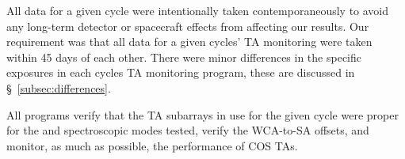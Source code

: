 All data for a given cycle were intentionally taken contemporaneously to avoid any long-term detector or spacecraft effects from affecting our results.
Our requirement was that all data for a given cycles' TA monitoring were taken within 45 days of each other.
There were minor differences in the specific exposures in each cycles TA monitoring program, these are discussed in \S~\ref{subsec:differences}.

All programs verify that the TA subarrays in use for the given cycle were proper for the \tacq and spectroscopic modes tested, verify the WCA-to-SA offsets, and monitor, as much as possible, the performance of COS TAs.
